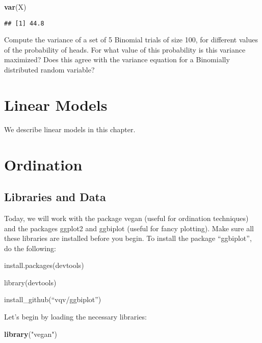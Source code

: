 \documentclass[
]{book}
\newenvironment{Shaded}{\begin{snugshade}}{\end{snugshade}}
\newcommand{\KeywordTok}[1]{\textcolor[rgb]{0.13,0.29,0.53}{\textbf{#1}}}
\newcommand{\NormalTok}[1]{#1}
\newcommand{\StringTok}[1]{\textcolor[rgb]{0.31,0.60,0.02}{#1}}
\begin{document}
\begin{Shaded}
\begin{Highlighting}[]
\KeywordTok{var}\NormalTok{(X)}
\end{Highlighting}
\end{Shaded}

\begin{verbatim}
## [1] 44.8
\end{verbatim}

Compute the variance of a set of 5 Binomial trials of size 100, for different values of the probability of heads. For what value of this probability is this variance maximized? Does this agree with the variance equation for a Binomially distributed random variable?

\hypertarget{linear-models}{%
\chapter{Linear Models}\label{linear-models}}

We describe linear models in this chapter.

\hypertarget{ordination}{%
\chapter{Ordination}\label{ordination}}

\hypertarget{libraries-and-data}{%
\section{Libraries and Data}\label{libraries-and-data}}

Today, we will work with the package vegan (useful for ordination techniques) and the packages ggplot2 and ggbiplot (useful for fancy plotting). Make sure all these libraries are installed before you begin. To install the package ``ggbiplot'', do the following:

install.packages(devtools)

library(devtools)

install\_github(``vqv/ggbiplot'')

Let's begin by loading the necessary libraries:

\begin{Shaded}
\begin{Highlighting}[]
\KeywordTok{library}\NormalTok{(}\StringTok{"vegan"}\NormalTok{)}
\end{Highlighting}
\end{Shaded}
\end{document}

